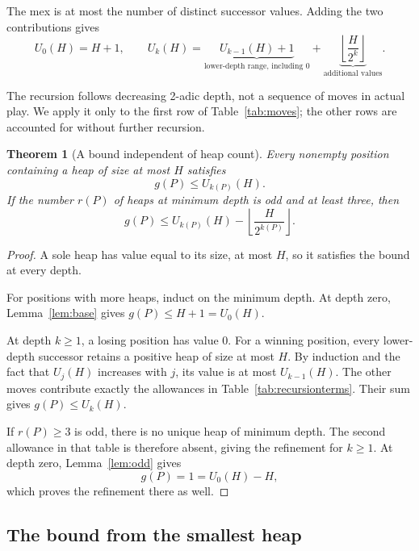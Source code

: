 \documentclass[10pt,a4paper]{article}
\newtheorem{theorem}{Theorem}[section]
\begin{document}
The mex is at most the number of distinct successor values.
Adding the two contributions gives
\begin{equation}
 U_0(H)=H+1,
 \qquad
 \boxed{
 U_k(H)=
 \underbrace{U_{k-1}(H)+1}_{\text{lower-depth range, including }0}
 +\underbrace{\left\lfloor\frac{H}{2^k}\right\rfloor}_{
 \text{additional values}}.
 }
 \label{eq:recursion}
\end{equation}

The recursion follows decreasing 2-adic depth, not a sequence
of moves in actual play. We apply it only to the first row
of Table~\ref{tab:moves}; the other rows are accounted for
without further recursion.


\begin{theorem}[A bound independent of heap count]
\label{thm:bound}
Every nonempty position containing a heap of size at most $H$
satisfies
\[
 g(P)\le U_{k(P)}(H).
\]
If the number $r(P)$ of heaps at minimum depth is odd and at
least three, then
\begin{equation}
 g(P)\le
 U_{k(P)}(H)
 -
 \left\lfloor\frac{H}{2^{k(P)}}\right\rfloor.
 \label{eq:refined}
\end{equation}
\end{theorem}


\begin{proof}
A sole heap has value equal to its size, at most $H$, so it
satisfies the bound at every depth.

For positions with more heaps, induct on the minimum depth.
At depth zero, Lemma~\ref{lem:base} gives
$g(P)\le H+1=U_0(H)$.

At depth $k\ge1$, a losing position has value $0$.
For a winning position, every lower-depth successor retains
a positive heap of size at most $H$. By induction and the
fact that $U_j(H)$ increases with $j$, its value is at most
$U_{k-1}(H)$. The other moves contribute exactly the allowances
in Table~\ref{tab:recursionterms}. Their sum gives
$g(P)\le U_k(H)$.

If $r(P)\ge3$ is odd, there is no unique heap of minimum depth.
The second allowance in that table is therefore absent, giving
the refinement for $k\ge1$. At depth zero, Lemma~\ref{lem:odd}
gives
\[
 g(P)=1=U_0(H)-H,
\]
which proves the refinement there as well.
\end{proof}

\subsection{The bound from the smallest heap}
\end{document}
